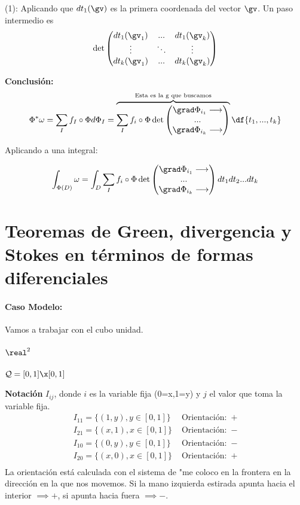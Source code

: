 (1): Aplicando que $dt_1(\gv)$ es la primera coordenada del vector $\gv$. Un paso intermedio es \[\det \begin{pmatrix}
dt_1(\gv_1) & ... & dt_1(\gv_k)\\
\vdots & \ddots & \vdots\\
dt_k(\gv_1) & ... & dt_k(\gv_k)
\end{pmatrix}\]

\textbf{Conclusión:}
\[
\Phi^{\ast} \omega = \sum_I f_I\circ\Phi d\Phi_I =
\overbrace{\sum_I f_i\circ\Phi 
\det\begin{pmatrix}
\grad \Phi_{i_1} \longrightarrow \\
...\\
\grad \Phi_{i_k} \longrightarrow 
\end{pmatrix}}^{\text{Esta es la g que buscamos}} \df{t_1,...,t_k}
\]

Aplicando a una integral:

\[\int_{\Phi(D)} \omega = \int_D \sum_I f_i\circ\Phi 
\det\begin{pmatrix}
\grad \Phi_{i_1} \longrightarrow \\
...\\
\grad \Phi_{i_k} \longrightarrow 
\end{pmatrix}dt_1dt_2...dt_k\]


\section{Teoremas de Green, divergencia y Stokes en términos de formas diferenciales}
\paragraph{Caso Modelo:}

Vamos a trabajar con el cubo unidad.

\subparagraph{$\real^2$} $\mathcal{Q} = [0,1]\x[0,1]$

\textbf{Notación} $I_{ij}$, donde $i$ es la variable fija (0=x,1=y) y $j$ el valor que toma la variable fija.
\[\begin{array}{cc}
I_{11} =\{(1,y),y\in[0,1]\}&\text{ Orientación: }\, +\\
I_{21} =\{(x,1),x\in[0,1]\}&\text{ Orientación: }\, -\\
I_{10} =\{(0,y),y\in[0,1]\}&\text{ Orientación: }\, -\\
I_{20} =\{(x,0),x\in[0,1]\}&\text{ Orientación: }\, +\\
\end{array}
\]
La orientación está calculada con el sistema de "me coloco en la frontera en la dirección en la que nos movemos. Si la mano izquierda estirada apunta hacia el interior $\implies +$, si apunta hacia fuera $\implies -$.

